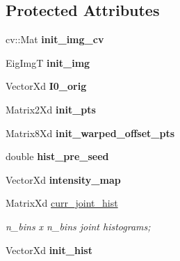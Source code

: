 \subsection*{Protected Attributes}
\begin{DoxyCompactItemize}
\item 
\hypertarget{classSCV_ab911f64ccbdc8518b74658820e72a1c7}{cv\-::\-Mat {\bfseries init\-\_\-img\-\_\-cv}}\label{classSCV_ab911f64ccbdc8518b74658820e72a1c7}

\item 
\hypertarget{classSCV_a825db972995d9868d0dce2670ced91dd}{Eig\-Img\-T {\bfseries init\-\_\-img}}\label{classSCV_a825db972995d9868d0dce2670ced91dd}

\item 
\hypertarget{classSCV_a81dcb2ebe1b6f92f6c5d40b1245a616e}{Vector\-Xd {\bfseries I0\-\_\-orig}}\label{classSCV_a81dcb2ebe1b6f92f6c5d40b1245a616e}

\item 
\hypertarget{classSCV_a84ac52a3bf1125f9876e67a8df75946d}{Matrix2\-Xd {\bfseries init\-\_\-pts}}\label{classSCV_a84ac52a3bf1125f9876e67a8df75946d}

\item 
\hypertarget{classSCV_ac4a267fcb28f4b0bc0cdaa48ccf0b431}{Matrix8\-Xd {\bfseries init\-\_\-warped\-\_\-offset\-\_\-pts}}\label{classSCV_ac4a267fcb28f4b0bc0cdaa48ccf0b431}

\item 
\hypertarget{classSCV_a460b61345d7b24bd86dd483d62566630}{double {\bfseries hist\-\_\-pre\-\_\-seed}}\label{classSCV_a460b61345d7b24bd86dd483d62566630}

\item 
\hypertarget{classSCV_a668c282b6a97b8bf420ac2c2960a1390}{Vector\-Xd {\bfseries intensity\-\_\-map}}\label{classSCV_a668c282b6a97b8bf420ac2c2960a1390}

\item 
\hypertarget{classSCV_ab71ff5f212973b5b7d03979f7075fea9}{Matrix\-Xd \hyperlink{classSCV_ab71ff5f212973b5b7d03979f7075fea9}{curr\-\_\-joint\-\_\-hist}}\label{classSCV_ab71ff5f212973b5b7d03979f7075fea9}

\begin{DoxyCompactList}\small\item\em n\-\_\-bins x n\-\_\-bins joint histograms; \end{DoxyCompactList}\item 
\hypertarget{classSCV_ae88062320678cbbbb8818bc1130c931a}{Vector\-Xd {\bfseries init\-\_\-hist}}\label{classSCV_ae88062320678cbbbb8818bc1130c931a}


\end{DoxyCompactItemize}
